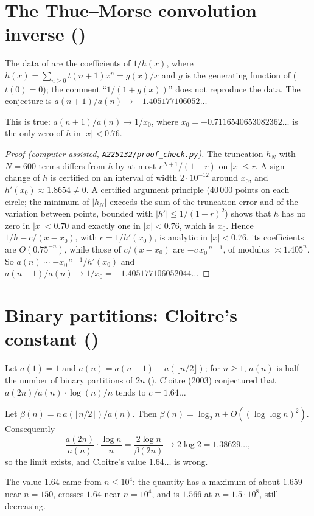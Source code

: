 \section{The Thue--Morse convolution inverse ()}\label{s:A225132}
The data of  are the coefficients of $1/h(x)$, where $h(x)=\sum_{n\ge0}t(n+1)x^n=g(x)/x$ and
$g$ is the generating function of  ($t(0)=0$); the comment ``$1/(1+g(x))$'' does not reproduce
the data. The conjecture is $a(n+1)/a(n)\to-1.405177106052\ldots$
\begin{proposition} This is true: $a(n+1)/a(n)\to1/x_0$, where $x_0=-0.7116540653082362\ldots$ is the only zero
of $h$ in $|x|<0.76$.\end{proposition}
\begin{proof}[Proof (computer-assisted, \texttt{A225132/proof\_check.py})] The truncation $h_N$ with $N=600$
terms differs from $h$ by at most $r^{N+1}/(1-r)$ on $|x|\le r$. A sign change of $h$ is certified on an
interval of width $2\cdot10^{-12}$ around $x_0$, and $h'(x_0)\approx1.8654\ne0$. A certified argument principle
(40\,000 points on each circle; the minimum of $|h_N|$ exceeds the sum of the truncation error and of the
variation between points, bounded with $|h'|\le1/(1-r)^2$) shows that $h$ has no zero in $|x|<0.70$ and exactly
one in $|x|<0.76$, which is $x_0$. Hence $1/h-c/(x-x_0)$, with $c=1/h'(x_0)$, is analytic in $|x|<0.76$, its
coefficients are $O(0.75^{-n})$, while those of $c/(x-x_0)$ are $-c\,x_0^{-n-1}$, of modulus $\asymp1.405^n$. So
$a(n)\sim-x_0^{-n-1}/h'(x_0)$ and $a(n+1)/a(n)\to1/x_0=-1.405177106052044\ldots$ \end{proof}

\section{Binary partitions: Cloitre's constant ()}\label{s:A033485}
Let $a(1)=1$ and $a(n)=a(n-1)+a(\lfloor n/2\rfloor)$; for $n\ge1$, $a(n)$ is half the number of binary partitions
of $2n$ (). Cloitre (2003) conjectured that $a(2n)/a(n)\cdot\log(n)/n$ tends to $c=1.64\ldots$
\begin{theorem}\label{t:A033485} Let $\beta(n)=n\,a(\lfloor n/2\rfloor)/a(n)$. Then
$\beta(n)=\log_2n+O((\log\log n)^2)$. Consequently
\[ \frac{a(2n)}{a(n)}\cdot\frac{\log n}{n}=\frac{2\log n}{\beta(2n)}\longrightarrow2\log2=1.38629\ldots, \]
so the limit exists, and Cloitre's value $1.64\ldots$ is wrong.\end{theorem}
The value $1.64$ came from $n\le10^4$: the quantity has a maximum of about $1.659$ near $n=150$, crosses $1.64$
near $n=10^4$, and is $1.566$ at $n=1.5\cdot10^8$, still decreasing.

